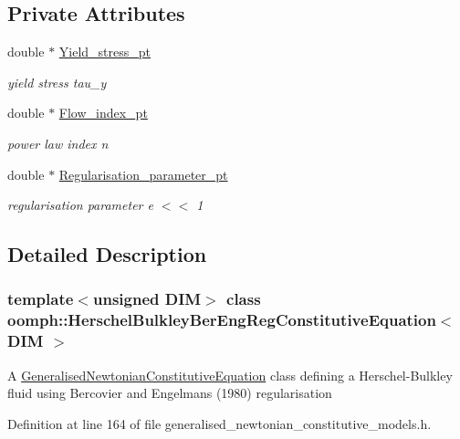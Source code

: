 \subsection*{Private Attributes}
\begin{DoxyCompactItemize}
\item 
double $\ast$ \hyperlink{classoomph_1_1HerschelBulkleyBerEngRegConstitutiveEquation_a34fcbd9d7a01ec046749e3b2ca4ef0b8}{Yield\+\_\+stress\+\_\+pt}
\begin{DoxyCompactList}\small\item\em yield stress tau\+\_\+y \end{DoxyCompactList}\item 
double $\ast$ \hyperlink{classoomph_1_1HerschelBulkleyBerEngRegConstitutiveEquation_aa4aae1728d199137b187fc075d2e203d}{Flow\+\_\+index\+\_\+pt}
\begin{DoxyCompactList}\small\item\em power law index n \end{DoxyCompactList}\item 
double $\ast$ \hyperlink{classoomph_1_1HerschelBulkleyBerEngRegConstitutiveEquation_aaaf787351aa31ee08246b7c4edcca066}{Regularisation\+\_\+parameter\+\_\+pt}
\begin{DoxyCompactList}\small\item\em regularisation parameter e $<$$<$ 1 \end{DoxyCompactList}\end{DoxyCompactItemize}


\subsection{Detailed Description}
\subsubsection*{template$<$unsigned D\+IM$>$\newline
class oomph\+::\+Herschel\+Bulkley\+Ber\+Eng\+Reg\+Constitutive\+Equation$<$ D\+I\+M $>$}

A \hyperlink{classoomph_1_1GeneralisedNewtonianConstitutiveEquation}{Generalised\+Newtonian\+Constitutive\+Equation} class defining a Herschel-\/\+Bulkley fluid using Bercovier and Engelman\textquotesingle{}s (1980) regularisation 

Definition at line 164 of file generalised\+\_\+newtonian\+\_\+constitutive\+\_\+models.\+h.



